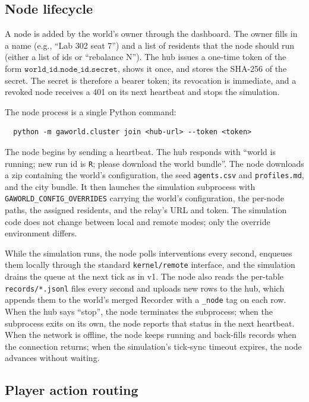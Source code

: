 \subsection{Node lifecycle}

A node is added by the world's owner through the dashboard.  The owner
fills in a name (e.g., ``Lab 302 seat 7'') and a list of residents that
the node should run (either a list of ids or ``rebalance N'').  The hub
issues a one-time token of the form
$\texttt{world\_id}.\texttt{node\_id}.\texttt{secret}$, shows it once,
and stores the SHA-256 of the secret.  The secret is therefore a bearer
token; its revocation is immediate, and a revoked node receives a 401 on
its next heartbeat and stops the simulation.

The node process is a single Python command:

\begin{verbatim}
  python -m gaworld.cluster join <hub-url> --token <token>
\end{verbatim}

The node begins by sending a heartbeat.  The hub responds with
``world is running; new run id is \texttt{R}; please download the
world bundle''.  The node downloads a zip containing the world's
configuration, the seed \texttt{agents.csv} and \texttt{profiles.md},
and the city bundle.  It then launches the simulation subprocess with
\texttt{GAWORLD\_CONFIG\_OVERRIDES} carrying the world's configuration,
the per-node paths, the assigned residents, and the relay's URL and
token.  The simulation code does not change between local and remote
modes; only the override environment differs.

While the simulation runs, the node polls interventions every second,
enqueues them locally through the standard \texttt{kernel/remote}
interface, and the simulation drains the queue at the next tick as in v1.
The node also reads the per-table \texttt{records/*.jsonl} files every
second and uploads new rows to the hub, which appends them to the
world's merged Recorder with a \texttt{\_node} tag on each row.  When
the hub says ``stop'', the node terminates the subprocess; when the
subprocess exits on its own, the node reports that status in the next
heartbeat.  When the network is offline, the node keeps running and
back-fills records when the connection returns; when the simulation's
tick-sync timeout expires, the node advances without waiting.

\subsection{Player action routing}

